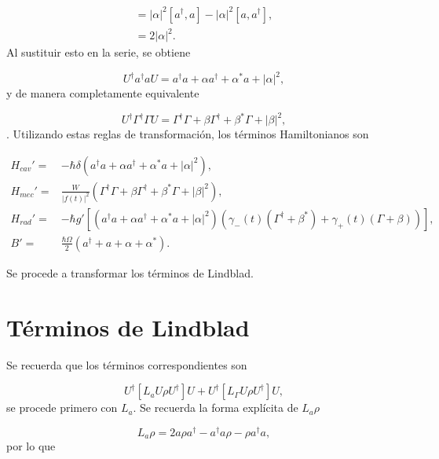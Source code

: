 \documentclass[a4paper,10pt]{report}
\begin{document}
\begin{align*}
[\alpha a^{\dagger} + \alpha^* a,\alpha a^\dagger - \alpha^*a] = |\alpha|^2[a^{\dagger},a]-|\alpha|^2[a,a^{\dagger}],\\
=2|\alpha|^2.
\end{align*} Al sustituir esto en la serie, se obtiene

\begin{equation}
U^\dagger a^\dagger a U = a^\dagger a +\alpha a^\dagger + \alpha^* a + |\alpha|^2,
\end{equation} y de manera completamente equivalente

\begin{equation}
U^\dagger \Gamma^\dagger \Gamma U = \Gamma^\dagger \Gamma +\beta \Gamma^\dagger + \beta^* \Gamma + |\beta|^2,
\end{equation}. Utilizando estas reglas de transformación, los términos Hamiltonianos son

\begin{align}
H_{cav}' =& -\hbar \delta(a^{\dagger}a +\alpha a^{\dagger}+\alpha^* a + |\alpha|^2),\\
H_{mec}' =& \frac{W}{|f(t)|^2}(\Gamma^{\dagger}\Gamma + \beta \Gamma^{\dagger} + \beta^* \Gamma + |\beta|^2 ),\\
H_{rad}'=&-\hbar g'[(a^{\dagger}a +\alpha a^{\dagger}+\alpha^* a + |\alpha|^2)(\gamma_-(t)(\Gamma^{\dagger}+\beta^*)+\gamma_+(t)(\Gamma+\beta))],\\
B' =& \frac{\hbar \Omega}{2}(a^{\dagger} + a +\alpha + \alpha^*).
\end{align}

Se procede a transformar los términos de Lindblad.

\section{Términos de Lindblad}

Se recuerda que los términos correspondientes son

\begin{equation}
U^\dagger [L_aU\rho U^\dagger]U + U^\dagger [L_\Gamma U\rho U^\dagger]U,
\end{equation} se procede primero con $L_a$. Se recuerda la forma explícita de $L_a \rho$

\begin{equation}
L_a\rho = 2a\rho a^\dagger - a^\dagger a \rho - \rho a^\dagger a,
\end{equation} por lo que
\end{document}
